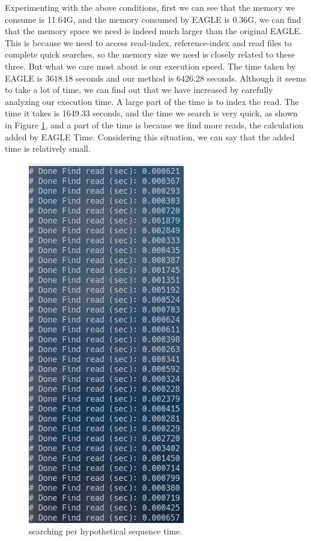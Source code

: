 Experimenting with the above conditions, first we can see that the memory we consume is 11.64G, and the memory consumed by EAGLE is 0.36G, we can find that the memory space we need is indeed much larger than the original EAGLE. This is because we need to access read-index, reference-index and read files to complete quick searches, so the memory size we need is closely related to these three.
But what we care most about is our execution speed. The time taken by EAGLE is 3618.18 seconds and our method is 6426.28 seconds. Although it seems to take a lot of time, we can find out that we have increased by carefully analyzing our execution time. A large part of the time is to index the read. The time it takes is 1649.33 seconds, and the time we search is very quick, as shown in Figure \ref{search_time}, and a part of the time is because we find more reads, the calculation added by EAGLE Time. Considering this situation, we can say that the added time is relatively small.

\begin{figure}[H]
    \centering
    \includegraphics[width=0.4\columnwidth]{body/image/search_time.png}
    \captionsetup{labelfont=bf}
    \renewcommand{\baselinestretch}{1.0}
    \caption[searching time]{searching per hypothetical sequence time.}
    \label{search_time}
\end{figure}
